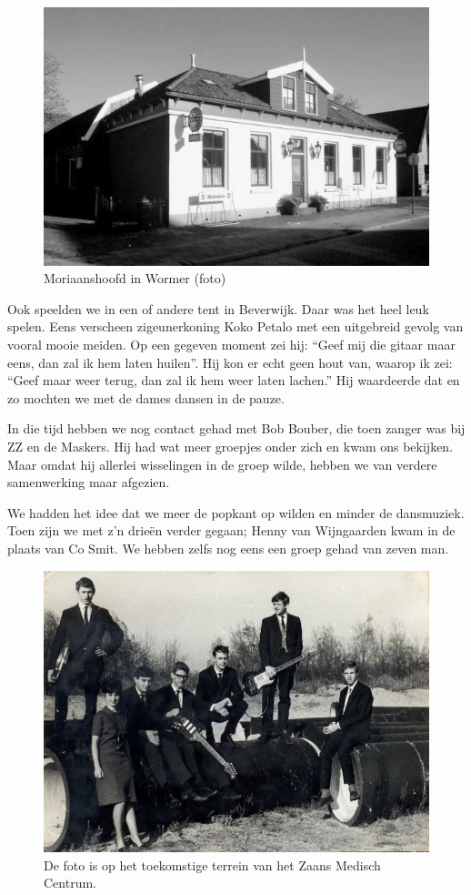 \documentclass[12pt,twoside, openright]{memoir}
\begin{document}
\begin{figure}
\includegraphics[width=\textwidth]{img/ch26/Moriaanshoofd}
\caption*{\footnotesize Moriaanshoofd in Wormer (foto)}
\end{figure}

Ook speelden we in een of andere tent in Beverwijk. Daar was het heel leuk spelen. Eens verscheen zigeunerkoning Koko Petalo met een uitgebreid gevolg van vooral mooie meiden. Op een gegeven moment zei hij: ``Geef mij die gitaar maar eens, dan zal ik hem laten huilen''. Hij kon er echt geen hout van, waarop ik zei: ``Geef maar weer terug, dan zal ik hem weer laten lachen.'' Hij waardeerde dat en zo mochten we met de dames dansen in de pauze.

In die tijd hebben we nog contact gehad met Bob Bouber, die toen zanger was bij ZZ en de Maskers. Hij had wat meer groepjes onder zich en kwam ons bekijken. Maar omdat hij allerlei wisselingen in de groep wilde, hebben we van verdere samenwerking maar afgezien. 

We hadden het idee dat we meer de popkant op wilden en minder de dansmuziek. Toen zijn we met z’n drieën verder gegaan; Henny van Wijngaarden kwam in de plaats van Co Smit. We hebben zelfs nog eens een groep gehad van zeven man.

\begin{figure}
\includegraphics[width=\textwidth]{img/ch26/1965}
\caption*{\footnotesize De foto is op het toekomstige terrein van het Zaans Medisch Centrum.}
\end{figure}
\end{document}

